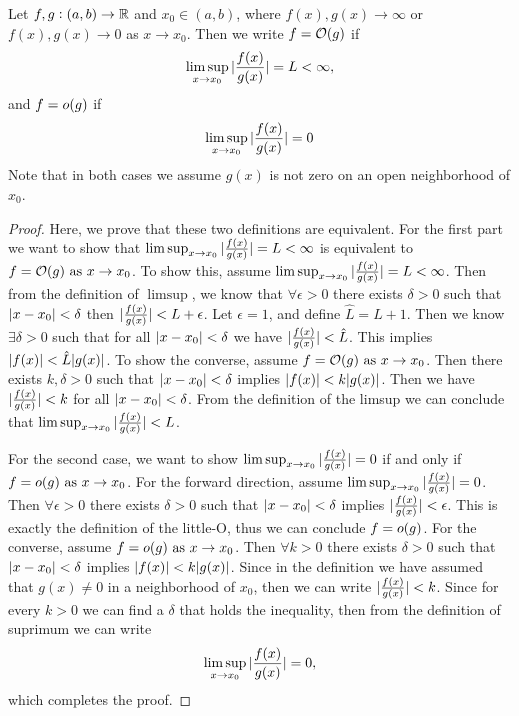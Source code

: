\begin{definition}
	Let $ f,g: (a,b)\to\mathbb{R} $ and $ x_0\in(a,b) $, where $ f(x),g(x)\to\infty $ or $ f(x),g(x)\to 0 $ as $ x\to x_0 $. Then we write $ f = \mathcal{O}(g) $ if
	\[ \limsup_{x\to x_0} |\frac{f(x)}{g(x)}| = L < \infty, \]
	and $ f = o(g) $
	if 
	\[ \limsup_{x\to x_0} |\frac{f(x)}{g(x)}| =0 \]
	Note that in both cases we assume $ g(x) $ is not zero on an open neighborhood of $ x_0 $.
\end{definition}
\begin{proof}
	Here, we prove that these two definitions are equivalent. For the first part we want to show that $ \limsup_{x\to x_0} |\frac{f(x)}{g(x)}| = L < \infty $ is equivalent to $ f = \O(g) \ \text{as}\ x\to x_0$. To show this, assume $ \limsup_{x\to x_0} |\frac{f(x)}{g(x)}| = L < \infty $. Then from the definition of $ \limsup $, we know that $ \forall \epsilon > 0 $ there exists $ \delta > 0 $ such that $ |x - x_0 | < \delta $ then $ |\frac{f(x)}{g(x)}| < L + \epsilon $. Let $ \epsilon = 1 $, and define $ \hat{L} = L + 1 $. Then we know $ \exists \delta > 0 $ such that for all $ |x - x_0|<\delta $ we have $ |\frac{f(x)}{g(x)}| < \hat{L} $. This implies $ |f(x)| < \hat{L} |g(x)| $. To show the converse, assume $ f = \O(g) \ \text{as}\ x\to x_0 $. Then there exists $ k,\delta > 0 $ such that $ |x - x_0| < \delta $ implies $ |f(x)| < k |g(x)|$. Then we have $ |\frac{f(x)}{g(x)}| < k $ for all $ |x - x_0|< \delta $. From the definition of the limsup we can conclude that $ \limsup_{x\to x_0} |\frac{f(x)}{g(x)}| < L $.
	
	\noindent For the second case, we want to show $ \limsup_{x\to x_0} |\frac{f(x)}{g(x)}| = 0 $ if and only if $ f = \o(g)\ \text{as}\ x\to x_0 $. For the forward direction, assume $ \limsup_{x\to x_0} |\frac{f(x)}{g(x)}| = 0 $. Then $ \forall \epsilon>0 $ there exists $ \delta > 0 $ such that $ |x - x_0| < \delta  $ implies $ |\frac{f(x)}{g(x)}| < \epsilon $. This is exactly the definition of the little-O, thus we can conclude $ f = o(g) $. For the converse, assume $ f= \o(g)\ \text{as}\ x\to x_0 $. Then $ \forall k >0 $ there exists $ \delta > 0 $ such that $ |x - x_0|<\delta $ implies $ |f(x)| < k |g(x)|$. Since in the definition we have assumed that $  g(x) \neq 0 $ in a neighborhood of $ x_0 $, then we can write $ |\frac{f(x)}{g(x)}| < k $. Since for every $ k > 0 $ we can find a $ \delta $ that holds the inequality, then from the definition of suprimum we can write
	\[ \limsup_{x\to x_0}|\frac{f(x)}{g(x)}| = 0, \]
	which completes the proof.
\end{proof}

